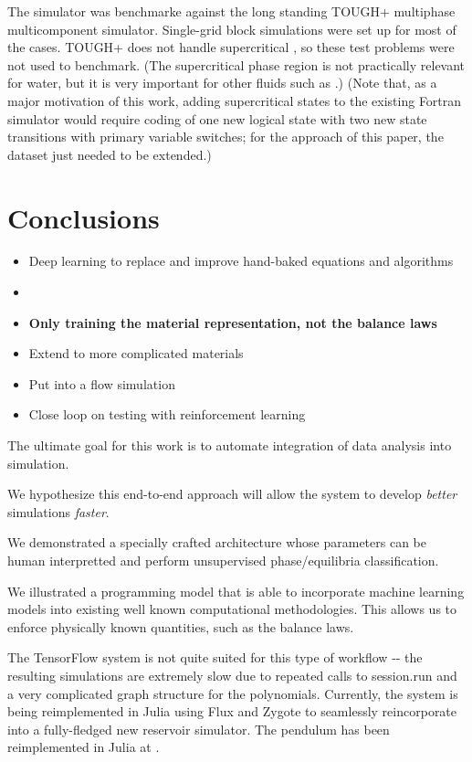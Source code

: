 \documentclass[AMA,STIX1COL]{WileyNJD-v2}
\begin{document}
The simulator was benchmarke against the long standing TOUGH+ multiphase
multicomponent simulator. Single-grid block simulations were set up for most of the cases. TOUGH+
does not handle supercritical , so these test problems were not
used to benchmark. (The supercritical phase region is not practically
relevant for water, but it is very important for other fluids such as
.) (Note that, as a major motivation of this work, adding
supercritical states to the existing Fortran simulator would require
coding of one new logical state with two new state transitions with
primary variable switches; for the approach of this paper, the dataset
just needed to be extended.)


\hypertarget{header-n3421}{%
\section{Conclusions}\label{header-n3421}}

\begin{itemize}
\item
  Deep learning to replace and improve hand-baked equations and
  algorithms
\item
\item
  \textbf{Only training the material representation, not the balance
  laws}
\item
  Extend to more complicated materials
\item
  Put into a flow simulation
\item
  Close loop on testing with reinforcement learning
\end{itemize}

The ultimate goal for this work is to automate integration of data
analysis into simulation.

We hypothesize this end-to-end approach will allow the system to develop
\emph{better} simulations \emph{faster}.

We demonstrated a specially crafted architecture whose parameters can be
human interpretted and perform unsupervised phase/equilibria
classification.

We illustrated a programming model that is able to incorporate machine
learning models into existing well known computational methodologies.
This allows us to enforce physically known quantities, such as the
balance laws.

The TensorFlow system is not quite suited for this type of workflow -\/-
the resulting simulations are extremely slow due to repeated calls to
session.run and a very complicated graph structure for the polynomials.
Currently, the system is being reimplemented in Julia using Flux and
Zygote to seamlessly reincorporate into a fully-fledged new reservoir
simulator. The pendulum has been reimplemented in Julia at .
\end{document}
